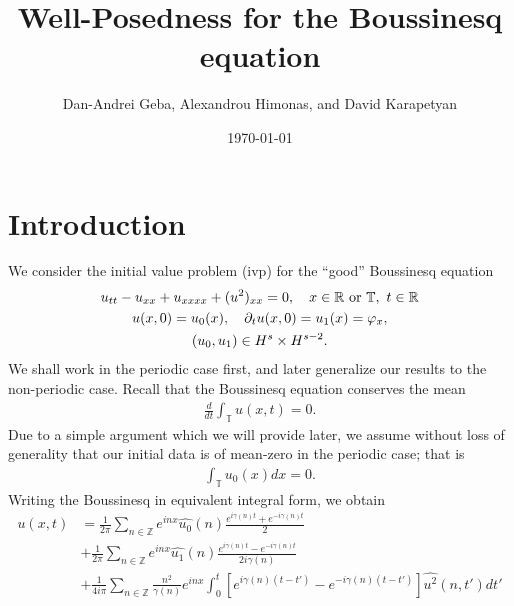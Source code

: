 \documentclass[12pt,reqno]{amsart}
\numberwithin{equation}{section}  %
\newcommand{\rr}{\mathbb{R}}
\newcommand{\zz}{\mathbb{Z}}
\newcommand{\ci}{\mathbb{T}}
\newcommand{\wh}{\widehat}
\newcommand{\p}{\partial}
\newcommand{\vp}{\varphi}
\begin{document}
\title{Well-Posedness for the Boussinesq equation}
\author{Dan-Andrei Geba, Alexandrou Himonas, and David Karapetyan}
\address{Department of Mathematics, University of Rochester, Rochester, NY 14627}
\address{Department of Mathematics, University of Notre Dame, Notre Dame, IN 46556}
\address{Department of Mathematics, University of Notre Dame, Notre Dame, IN 46556}
\date{\today}
%
%
\maketitle
\tableofcontents
%
%
\section{Introduction}
%
We consider the initial value problem (ivp) for the ``good'' Boussinesq
equation 
\begin{gather}
  u_{tt} -u_{xx} + u_{xxxx} + (u^2)_{xx} = 0, \quad x \in \rr \ \text{or} \
  \ci, \ t \in \rr
  \label{eqn:mb-2}
  \\
  u(x,0) = u_{0}(x), \quad \p_t u(x, 0) = u_{1}(x)= \vp_{x}, 
  \label{eqn:mb-init-data-2}
  \\
  \notag
  (u_0, u_1) \in
  H^{s}\times
  H^{s-2}.
\end{gather}
%
%
We shall work in the periodic case first, and later generalize our results to
the non-periodic case. Recall that the Boussinesq equation conserves the mean
%
%
\begin{equation*}
\begin{split}
\frac{d}{dt} \int_{\ci} u(x,t) = 0.
\end{split}
\end{equation*}
%
%
Due to a simple argument which we will provide later, we assume without loss of generality that our initial data is of mean-zero in the periodic case; that is 
%
%
\begin{equation*}
\begin{split}
\int_{\ci} u_{0}(x) dx = 0.
\end{split}
\end{equation*}
%
%
Writing the Boussinesq in equivalent integral form, we obtain 
%
\begin{equation}
  \begin{split}
    u(x,t)
    & = \frac{1}{2\pi}\sum_{n \in \zz} e^{inx} \wh{u_{0}}(n) \frac{e^{i\gamma(n)t} + e^{-i\gamma(n)t}}{2} 
    \\
    & + \frac{1}{2 \pi}\sum_{n \in \zz} e^{inx}
    \wh{u_{1}}(n)\frac{e^{i\gamma(n)t} - e^{-i\gamma(n)t}}{2 i \gamma(n)} 
    \\
    & + \frac{1}{4 i \pi}\sum_{n \in \zz} \frac{n^{2}}{\gamma(n)} e^{inx}
    \int_{0}^{t}[e^{i\gamma(n)(t-t')}-e^{-i\gamma(n)(t-t')}]
    \wh{u^{2}}(n, t') dt'
  \end{split}
  \label{eqn:integral-form}
\end{equation}
\end{document}
